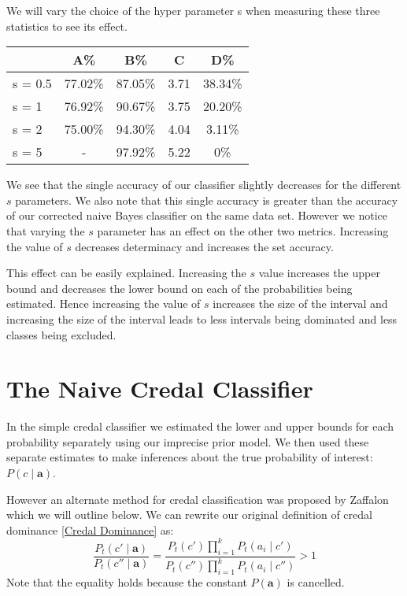 We will vary the choice of the hyper parameter s when measuring these three statistics to see its effect.
\begin{center}
\begin{tabular}{l|c c c c}
        & A\%     & B\%     & C    & D\%     \\
\hline
s = 0.5 & 77.02\% & 87.05\% & 3.71 & 38.34\% \\
s = 1   & 76.92\% & 90.67\% & 3.75 & 20.20\% \\
s = 2   & 75.00\% & 94.30\% & 4.04 & 3.11\% \\
s = 5   & -       & 97.92\% & 5.22 & 0\%   \\
\end{tabular}
\end{center}

We see that the single accuracy of our classifier slightly decreases for the different $s$ parameters.
We also note that this single accuracy is greater than the accuracy of our corrected naive Bayes classifier on the same data set.
However we notice that varying the $s$ parameter has an effect on the other two metrics.
Increasing the value of $s$ decreases determinacy and increases the set accuracy.

This effect can be easily explained.
Increasing the $s$ value increases the upper bound and decreases the lower bound on each of the probabilities being estimated.
Hence increasing the value of $s$ increases the size of the interval and increasing the size of the interval leads to less intervals being dominated and less classes being excluded.

\section{The Naive Credal Classifier}
In the simple credal classifier we estimated the lower and upper bounds for each probability separately using our imprecise prior model.
We then used these separate estimates to make inferences about the true probability of interest: $P(c \mid \mathbf{a})$.

However an alternate method for credal classification was proposed by Zaffalon \cite{Zaffalon01} which we will outline below.
We can rewrite our original definition of credal dominance \cref{Credal Dominance} as:
\begin{equation}
	\frac{P_t(c' \mid \mathbf{a})}{P_t(c'' \mid \mathbf{a})} = \frac{P_t(c')\prod_{i=1}^{k}P_t(a_i \mid c')}{P_t(c'')\prod_{i=1}^{k}P_t(a_i \mid c'')} > 1
\end{equation}
Note that the equality holds because the constant $P(\mathbf{a})$ is cancelled.

